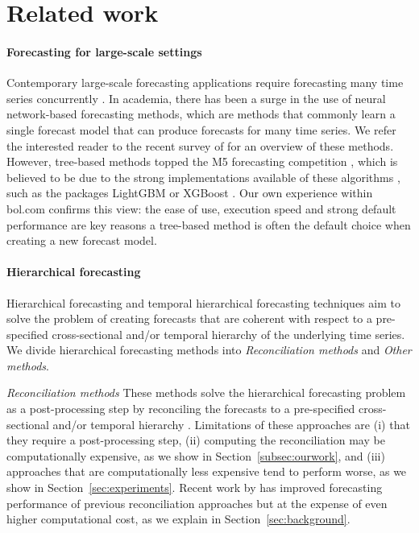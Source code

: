 \documentclass[preprint, 3p, times, twocolumn]{elsarticle}
\begin{document}
\section{Related work} \label{sec:relwork}

\paragraph{Forecasting for large-scale settings} Contemporary large-scale forecasting applications require forecasting many time series concurrently \cite{bose_probabilistic_2017}. In academia, there has been a surge in the use of neural network-based forecasting methods, which are methods that commonly learn a single forecast model that can produce forecasts for many time series. We refer the interested reader to the recent survey of \citet{benidis_deep_2023} for an overview of these methods. However, tree-based methods topped the M5 forecasting competition \cite{makridakis_m5_2022}, which is believed to be due to the strong implementations available of these algorithms \cite{januschowski_forecasting_2022}, such as the packages LightGBM \cite{ke_lightgbm_2017} or XGBoost \cite{chen_xgboost_2016}. Our own experience within bol.com confirms this view: the ease of use, execution speed and strong default performance are key reasons a tree-based method is often the default choice when creating a new forecast model.

\paragraph{Hierarchical forecasting} Hierarchical forecasting \cite{hyndman_optimal_2011, hyndman_fast_2016, taieb_coherent_2017, bentaieb_regularized_2019, wickramasuriya_optimal_2019} and temporal hierarchical forecasting techniques \cite{taieb_sparse_2017,athanasopoulos_forecasting_2017,rangapuram_coherent_2023,theodosiou_forecasting_2021} aim to solve the problem of creating forecasts that are coherent with respect to a pre-specified cross-sectional and/or temporal hierarchy of the underlying time series. We divide hierarchical forecasting methods into \textit{Reconciliation methods} and \textit{Other methods}.

\textit{Reconciliation methods} These methods solve the hierarchical forecasting problem as a post-processing step by reconciling the forecasts to a pre-specified cross-sectional and/or temporal hierarchy \cite{hyndman_optimal_2011, hyndman_fast_2016, taieb_coherent_2017, bentaieb_regularized_2019, wickramasuriya_optimal_2019, panagiotelis_forecast_2021, girolimetto_point_2023}. Limitations of these approaches are (i) that they require a post-processing step, (ii) computing the reconciliation may be computationally expensive, as we show in Section~\ref{subsec:ourwork}, and (iii) approaches that are computationally less expensive tend to perform worse, as we show in Section~\ref{sec:experiments}. Recent work by \citet{taieb_sparse_2017, bentaieb_regularized_2019} has improved forecasting performance of previous reconciliation approaches but at the expense of even higher computational cost, as we explain in Section~\ref{sec:background}.
\end{document}
